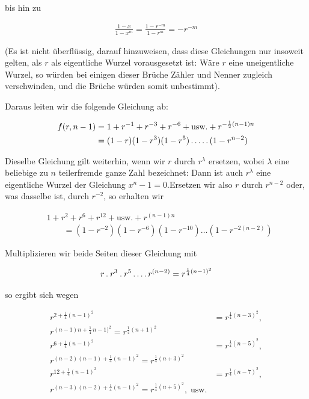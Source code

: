 bis hin zu

\[
\begin{aligned}
\frac{1-x}{1-x^m}=\frac{1-r^{-m}}{1-r^m}=-r^{-m}
\end{aligned}
\]

(Es ist nicht überflüssig, darauf hinzuweisen, dass diese Gleichungen nur insoweit gelten, als $r$ als eigentliche Wurzel vorausgesetzt ist: Wäre $r$ eine uneigentliche Wurzel, so würden bei einigen dieser Brüche Zähler und Nenner zugleich verschwinden, und die Brüche würden somit unbestimmt).

Daraus leiten wir die folgende Gleichung ab:


\[
\begin{aligned}
f(r,n-1)&=1+r^{-1}+r^{-3}+r^{-6}+\text{usw.}+r^{-\frac12(n-1)n}\\
&=(1-r)(1-r^3)(1-r^5)\mathinner{.\,.\,.\,.\,.}(1-r^{n-2})
\end{aligned}
\]

Dieselbe Gleichung gilt weiterhin, wenn wir $r$ durch $r^\lambda$ ersetzen, wobei $\lambda$ eine beliebige zu $n$ teilerfremde ganze Zahl bezeichnet: Dann ist auch $r^\lambda$ eine eigentliche Wurzel der Gleichung $x^n-1=0$.\quad Ersetzen wir also $r$ durch $r^{n-2}$ oder, was dasselbe ist, durch $r^{-2}$, so erhalten wir

\[
\begin{aligned}
&1+r^2+r^6+r^{12}+\text{usw.}+r^{(n-1)n}\\&\qquad=(1-r^{-2})(1-r^{-6})(1-r^{-10})\ldots(1-r^{-2(n-2)})
\end{aligned}
\]

Multiplizieren wir beide Seiten dieser Gleichung mit

\[
\begin{aligned}
r\mathbin{.} r^3\mathbin{.} r^5\mathinner{.\,.\,.\,.} r^{(n-2)}=r^{\frac14(n-1)^2}
\end{aligned}
\]

so ergibt sich wegen

\[
\begin{aligned}
r^{2+\frac14(n-1)^2}&=r^{\frac14(n-3)^2},\\r^{(n-1)n+\frac14\,n-1)^2}=r^{\frac14(n+1)^2}\\
r^{6+\frac14(n-1)^2}&=r^{\frac14(n-5)^2},\\r^{(n-2)(n-1)+\frac14(n-1)^2}=r^{\frac14(n+3)^2}\\
r^{12+\frac14(n-1)^2}&=r^{\frac14(n-7)^2},\\r^{(n-3)(n-2)+\frac14(n-1)^2}=r^{\frac14(n+5)^2},\;\text{usw.}
\end{aligned}
\]

